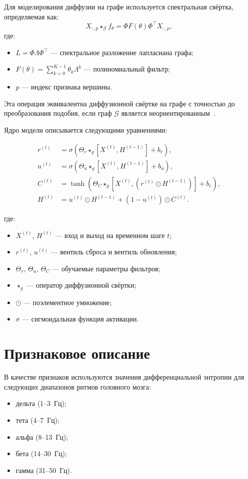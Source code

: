 \documentclass[12pt, twoside]{article}
\begin{document}
Для моделирования диффузии на графе используется спектральная свёртка, определяемая как:
\[
X_{:,p} \star_{\mathcal{G}} f_\theta = \Phi F(\theta) \Phi^\top X_{:,p},
\]
где:
\begin{itemize}
    \item $L = \Phi \Lambda \Phi^\top$ — спектральное разложение лапласиана графа;
    \item $F(\theta) = \sum_{k=0}^{K-1} \theta_k \Lambda^k$ — полиномиальный фильтр;
    \item $p$ — индекс признака вершины.
\end{itemize}

Эта операция эквивалентна диффузионной свёртке на графе с точностью до преобразования подобия, если граф $\mathcal{G}$ является неориентированным~\cite{DCRNN}.

Ядро модели описывается следующими уравнениями:

\begin{align*}
r^{(t)} &= \sigma\left(\Theta_r \star_{g} \left[X^{(t)}, H^{(t-1)}\right] + b_r\right), \\
u^{(t)} &= \sigma\left(\Theta_u \star_{g} \left[X^{(t)}, H^{(t-1)}\right] + b_u\right), \\
C^{(t)} &= \tanh\left(\Theta_C \star_{g} \left[X^{(t)}, \left(r^{(t)} \odot H^{(t-1)}\right)\right] + b_c\right), \\
H^{(t)} &= u^{(t)} \odot H^{(t-1)} + \left(1 - u^{(t)}\right) \odot C^{(t)}.
\end{align*}

где:
\begin{itemize}
    \item $X^{(t)}$, $H^{(t)}$ — вход и выход на временном шаге $t$;
    \item $r^{(t)}$, $u^{(t)}$ — вентиль сброса и вентиль обновления;
    \item $\Theta_r$, $\Theta_u$, $\Theta_C$ — обучаемые параметры фильтров;
    \item $\star_{g}$ — оператор диффузионной свёртки;
    \item $\odot$ — поэлементное умножение;
    \item $\sigma$ — сигмоидальная функция активации.
\end{itemize}

\section{Признаковое описание}

В качестве признаков используются значения дифференциальной энтропии для следующих диапазонов ритмов головного мозга:
\begin{itemize}
    \item дельта (1--3~Гц);
    \item тета (4--7~Гц);
    \item альфа (8--13~Гц);
    \item бета (14--30~Гц);
    \item гамма (31--50~Гц).
\end{itemize}
\end{document}
